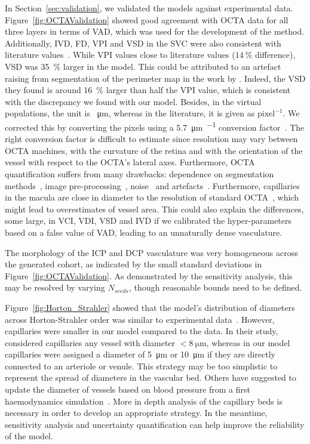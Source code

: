 \documentclass[11pt,]{article}
\begin{document}
In Section~\ref{sec:validation}, we validated the models against experimental data.
Figure~\ref{fig:OCTAValidation} showed good agreement with OCTA data for all three layers in terms of VAD, which was used for the development of the method.
Additionally, IVD, FD, VPI and VSD in the SVC were also consistent with literature values~\cite{Chu2016,Ma2021,Liu_2021}.
While VPI values close to literature values ($\SI{14}{\percent}$ difference), VSD was \SI{35}{\percent} larger in the model.
This could be attributed to an artefact raising from segmentation of the perimeter map in the work by \citet{Chu2016}.
Indeed, the VSD they found is around \SI{16}{\percent} larger than half the VPI value, which is consistent with the discrepancy we found with our model.
Besides, in the virtual populations, the unit is \SI{}{\micro\metre}, whereas in the literature, it is given as $\text{pixel}^{-1}$.
We corrected this by converting the pixels using a \SI{5.7}{\micro\metre\per{}} conversion factor~\cite{Spectralis}.
The right conversion factor is difficult to estimate since resolution may vary between OCTA machines, with the curvature of the retina and with the orientation of the vessel with respect to the OCTA's lateral axes. Furthermore, OCTA quantification suffers from many drawbacks: dependence on segmentation methods~\cite{Mehta_2020}, image pre-processing~\cite{Mehta_2019}, noise~\cite{Szpernal2023} and artefacts~\cite{Yao_2020}.
Furthermore, capillaries in the macula are close in diameter to the resolution of standard OCTA~\cite{Chu2016}, which might lead to overestimates of vessel area.
This could also explain the differences, some large, in VCI, VDI, VSD and IVD if we calibrated the hyper-parameters based on a false value of VAD, leading to an unnaturally dense vasculature.

The morphology of the ICP and DCP vasculature was very homogeneous across the generated cohort, as indicated by the small standard deviations in Figure~\ref{fig:OCTAValidation}.
As demonstrated by the sensitivity analysis, this may be resolved by varying $N_{seeds}$, though reasonable bounds need to be defined.

Figure~\ref{fig:Horton_Strahler} showed that the model's distribution of diameters across Horton-Strahler order was similar to experimental data~\cite{An2020}.
However, capillaries were smaller in our model compared to the data.
In their study, \citet{An2020} considered capillaries any vessel with diameter $<\SI{8}{\micro\metre}$, whereas in our model capillaries were assigned a diameter of \SI{5}{\micro\metre} or \SI{10}{\micro\metre} if they are directly connected to an arteriole or venule.
This strategy may be too simplistic to represent the spread of diameters in the vascular bed.
Others have suggested to update the diameter of vessels based on blood pressure from a first haemodynamics simulation~\cite{Linninger2013}.
More in depth analysis of the capillary beds is necessary in order to develop an appropriate strategy.
In the meantime, sensitivity analysis and uncertainty quantification can help improve the reliability of the model.
\end{document}

